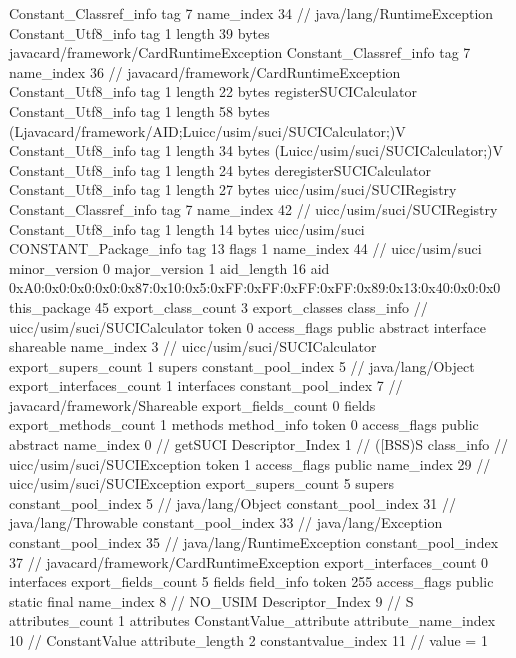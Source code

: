 {{{		}
		Constant_Classref_info {
			tag	7
			name_index	34		// java/lang/RuntimeException
		}
		Constant_Utf8_info {
			tag	1
			length	39
			bytes	javacard/framework/CardRuntimeException
		}
		Constant_Classref_info {
			tag	7
			name_index	36		// javacard/framework/CardRuntimeException
		}
		Constant_Utf8_info {
			tag	1
			length	22
			bytes	registerSUCICalculator
		}
		Constant_Utf8_info {
			tag	1
			length	58
			bytes	(Ljavacard/framework/AID;Luicc/usim/suci/SUCICalculator;)V
		}
		Constant_Utf8_info {
			tag	1
			length	34
			bytes	(Luicc/usim/suci/SUCICalculator;)V
		}
		Constant_Utf8_info {
			tag	1
			length	24
			bytes	deregisterSUCICalculator
		}
		Constant_Utf8_info {
			tag	1
			length	27
			bytes	uicc/usim/suci/SUCIRegistry
		}
		Constant_Classref_info {
			tag	7
			name_index	42		// uicc/usim/suci/SUCIRegistry
		}
		Constant_Utf8_info {
			tag	1
			length	14
			bytes	uicc/usim/suci
		}
		CONSTANT_Package_info {
			tag	13
			flags	1
			name_index	44		// uicc/usim/suci
			minor_version	0
			major_version	1
			aid_length	16
			aid	0xA0:0x0:0x0:0x0:0x87:0x10:0x5:0xFF:0xFF:0xFF:0xFF:0x89:0x13:0x40:0x0:0x0
		}
	}
	this_package	45
	export_class_count	3
	export_classes {
		class_info {		// uicc/usim/suci/SUCICalculator
			token	0
			access_flags	public abstract interface shareable
			name_index	3		// uicc/usim/suci/SUCICalculator
			export_supers_count	1
			supers {
				constant_pool_index	5		// java/lang/Object
			}
			export_interfaces_count	1
			interfaces {
				constant_pool_index	7		// javacard/framework/Shareable
			}
			export_fields_count	0
			fields {
			}
			export_methods_count	1
			methods {
				method_info {
					token	0
					access_flags	public abstract
					name_index	0		// getSUCI
					Descriptor_Index	1		// ([BSS)S
				}
			}
		}
		class_info {		// uicc/usim/suci/SUCIException
			token	1
			access_flags	public
			name_index	29		// uicc/usim/suci/SUCIException
			export_supers_count	5
			supers {
				constant_pool_index	5		// java/lang/Object
				constant_pool_index	31		// java/lang/Throwable
				constant_pool_index	33		// java/lang/Exception
				constant_pool_index	35		// java/lang/RuntimeException
				constant_pool_index	37		// javacard/framework/CardRuntimeException
			}
			export_interfaces_count	0
			interfaces {
			}
			export_fields_count	5
			fields {
			field_info {
				token	255
				access_flags	public static final
				name_index	8		// NO_USIM
				Descriptor_Index	9		// S
				attributes_count	1
				attributes {
				ConstantValue_attribute {
					attribute_name_index	10		// ConstantValue
					attribute_length	2
					constantvalue_index	11		// value = 1
}}}}}}}
